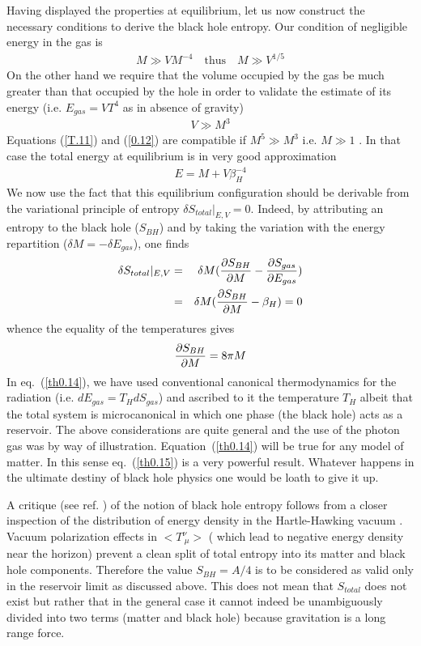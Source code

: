 \documentclass[12pt,oneside]{report}
\begin{document}
Having displayed the properties at equilibrium, let us now 
construct the necessary conditions to  derive
the black hole entropy.
Our condition of negligible energy in the gas is 
\begin{eqnarray}
M \gg V M^{-4} \quad \mbox{thus} \quad
M \gg  V^{1/5}
\label {T.11}
\end{eqnarray}
On the other hand we require that the volume occupied by the gas
be much greater than that occupied by the hole in order to validate
the estimate of its energy (i.e. $E_{gas} = V T^4$ as in absence of gravity) 
\begin{eqnarray}
V \gg  M ^3 
\label {0.12}
\end{eqnarray}
Equations (\ref{T.11}) and  (\ref {0.12}) are compatible if $ M^5 \gg  M^3 $ i.e.
$ M \gg  1 $ . In that case the total energy at equilibrium is in very good
approximation 
\begin{eqnarray}
E = M + V \beta^{-4}_{H} \label {0.13}
\end{eqnarray}
We now use the fact that this equilibrium configuration should be derivable
from the variational principle of entropy 
$\delta S_{total} \vert_{E,V} = 0$. Indeed, by attributing an entropy
to the black hole ($S_{BH}$) and by taking the variation with the
energy repartition ($\delta M = - \delta E_{gas}$), one finds
\begin{eqnarray}
 \delta S_{total} \vert_{E,V}  &=& \delta M
 ({\partial S_{BH} \over \partial M} -
{\partial S_{gas} \over \partial E_{gas}} ) \nonumber\\ &=&
 \delta M
 ({\partial S_{BH} \over
\partial M} - \beta_H) = 0 
\label{th0.14} 
\end{eqnarray}
 whence the equality of the temperatures gives
\begin{eqnarray}
 {\partial S_{BH} \over \partial M} = 8 \pi M 
\label{th0.15}
\end{eqnarray}
In eq.~(\ref{th0.14}), we have used conventional 
canonical thermodynamics for the radiation (i.e. $dE_{gas} = T_H dS_{gas}$) 
and ascribed to it the temperature $T_H$ albeit that the total system
is microcanonical in which one phase (the black hole) acts as a reservoir. 
The above considerations are quite general and the use of
the photon gas was by way of illustration. Equation~(\ref{th0.14}) will be
true for any model of matter.
In this sense eq.~(\ref{th0.15}) is a very powerful result. Whatever
happens in the ultimate destiny of black hole physics one would be
loath to give it up. 

A critique (see ref. \cite{PKO}) of the notion of black hole entropy follows from a
closer inspection of the distribution of energy density in the 
Hartle-Hawking vacuum \cite{How}. 
Vacuum polarization effects in $ < T_{\ \mu} ^{\nu}
> $ ( which lead to negative energy density near the horizon) prevent a
clean split of total entropy into its matter and black hole components.
Therefore the value $ S_{BH} = A / 4 $ is to be considered as valid only
in the reservoir limit as discussed above. This does not mean that $
S_{total} $ does not exist but rather that in the general case
it cannot indeed be unambiguously divided into two terms (matter and
black hole) because gravitation is a long range force.
\end{document}
